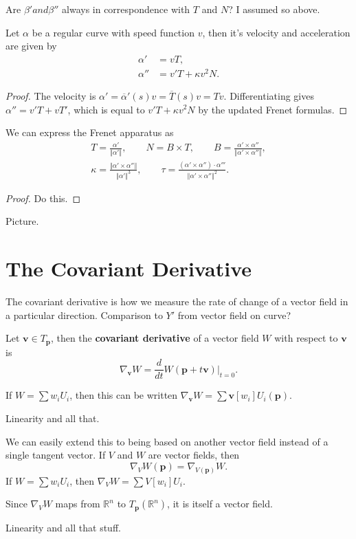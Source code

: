 \documentclass[10pt]{report}
\begin{document}
{\color{red}Are $\beta' and \beta''$ always in correspondence with $T$ and $N$? I assumed so above.}

\begin{lem}
	Let $\alpha$ be a regular curve with speed function $v$, then it's velocity and acceleration are given by
	\begin{align*}
		\alpha' &= vT, \\
		\alpha'' &= v'T + \kappa v^2 N.
	\end{align*}
\end{lem}
\begin{proof}
	The velocity is $\alpha' =\overline{\alpha}'(s)v = \overline{T}(s)v = Tv$. Differentiating gives $\alpha''=v'T + vT'$, which is equal to $v'T + \kappa v^2 N$ by the updated Frenet formulas.
\end{proof}

\begin{thrm}[]
We can express the Frenet apparatus as
\begin{gather*}
	T = \frac{\alpha'}{\Vert{\alpha'}\Vert} ,\quad\quad N = B \times T,\quad\quad B = \frac{\alpha' \times \alpha''}{\Vert{\alpha' \times \alpha''}\Vert} ,\\
	\kappa = \frac{\Vert{\alpha' \times \alpha''}\Vert}{\Vert{\alpha'}\Vert^3} ,\quad\quad \tau = \frac{(\alpha' \times \alpha'')\cdot \alpha'''}{\Vert{\alpha'\times \alpha''}\Vert^2} .
\end{gather*}
\end{thrm}
\begin{proof}
	{\color{red}Do this.}
\end{proof}

{\color{red}Picture.}


\section{The Covariant Derivative}

The covariant derivative is how we measure the rate of change of a vector field in a particular direction. {\color{red}Comparison to $Y'$ from vector field on curve?}

\begin{defn}[]
	Let $\mathbf{v} \in T_{\mathbf{p}}$, then the \textbf{covariant derivative} of a vector field $W$ with respect to $\mathbf{v}$ is
	\[
		\nabla_{\mathbf{v}}W = \frac{d }{d t} W(\mathbf{p}+t\mathbf{v})\Big|_{t=0}.
	\] 
\end{defn}

If $W = \sum w_i U_i$, then this can be written $\nabla_{\mathbf{v}}W = \sum \mathbf{v}[w_i]U_i(\mathbf{p})$.

{\color{red}Linearity and all that.}

We can easily extend this to being based on another vector field instead of a single tangent vector. If $V$ and $W$ are vector fields, then
\[
	\nabla_{V}W(\mathbf{p}) = \nabla_{V(\mathbf{p})}W.
\] If $W = \sum w_i U_i$, then $\nabla_{V}W = \sum V[w_i] U_i$.

Since $\nabla_{V}W$ maps from $\mathbb{R}^n$ to $T_{\mathbf{p}}(\mathbb{R}^n)$, it is itself a vector field.

{\color{red}Linearity and all that stuff.}
\end{document}
